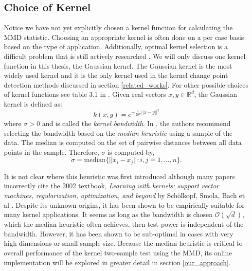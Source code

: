 \subsection{Choice of Kernel}
Notice we have not yet explicitly chosen a kernel function for calculating the MMD statistic. Choosing an appropriate kernel is often done on a per case basis based on the type of application. Additionally, optimal kernel selection is a difficult problem that is still actively researched \cite{fukumizu2009kernel} \cite{gretton2012optimal}. We will only discuss one kernel function in this thesis, the Gaussian kernel. The Gaussian kernel is the most widely used kernel and it is the only kernel used in the kernel change point detection methods discussed in section \ref{related_works}.  For other possible choices of kernel functions see table 3.1 in \cite{muandet2017kernel}.
Given real vectors $x, y \in \mathbb{R}^d$, the Gaussian kernel is defined as:
\begin{equation}
k(x, y)= e^{-\frac{1}{2\sigma^2}||x-y||^2}
\end{equation}
where $\sigma > 0$ and is called the \textit{kernel bandwidth}. In \cite{gretton2005kernel}, the authors recommend selecting the bandwidth based on the \textit{median heuristic} using a sample of the data. The median is computed on the set of pairwise distances between all data points in the sample. Therefore, $\sigma$ is computed by, 
\begin{equation}
\sigma=\text{median}\{||x_i-x_j||:i,j = 1,...,n \}.
\end{equation}

It is not clear where this heuristic was first introduced although many papers incorrectly cite the 2002 textbook, \textit{Learning with kernels: support vector machines, regularization, optimization, and beyond} by Sch{\"o}lkopf, Smola, Bach et al \cite{garreau2017large}. Despite its unknown origins, it has been shown to be empirically suitable for many kernel applications. It seems as long as the bandwidth is chosen $\mathcal{O}(\sqrt{d})$, which the median heuristic often achieves, then test power is independent of the bandwidth. However, it has been shown to be sub-optimal in cases with very high-dimensions \cite{muandet2014kernel} or small sample size\cite{ramdas2015decreasing}. Because the median heuristic is critical to overall performance of the kernel two-sample test using the MMD, its online implementation will be explored in greater detail in section \ref{our_approach}.
 
